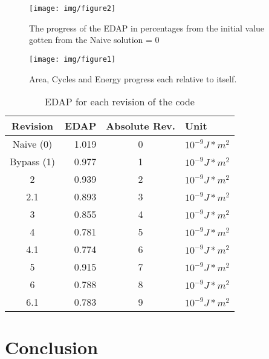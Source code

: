 \documentclass[10pt]{IEEEtran}
\begin{document}
\begin{figure}[h]
	\begin{center}
		\texttt{[image: img/figure2]}
		\caption{The progress of the EDAP in percentages from the initial value gotten from the Naive solution = 0}
		\label{fig:fig2}
	\end{center}
\end{figure} 

\begin{figure}[h]
	\begin{center}
		\texttt{[image: img/figure1]}
		\caption{Area, Cycles and Energy progress each relative to itself. }
		\label{fig:fig1}
	\end{center}
\end{figure} 

\begin{table}[htbp]
	\caption{EDAP for each revision of the code}
	\begin{center}
		\begin{tabular}{crcl}
			\midrule
			Revision & \multicolumn{1}{l}{ EDAP } & \multicolumn{1}{l}{ Absolute Rev. } &  Unit  \\ 
			\midrule
			Naive (0)   & 1.019 & 0 &   $10^{-9} J*m^2$  \\ 
			Bypass (1)   & 0.977 & 1 &   $10^{-9} J*m^2$  \\ 
			2  & 0.939 & 2 &   $10^{-9} J*m^2$  \\ 
			2.1  & 0.893 & 3 &   $10^{-9} J*m^2$  \\ 
			3  & 0.855 & 4 &   $10^{-9} J*m^2$  \\ 
			4  & 0.781 & 5 &   $10^{-9} J*m^2$  \\ 
			4.1  & 0.774 & 6 &   $10^{-9} J*m^2$  \\ 
			5  & 0.915 & 7 &   $10^{-9} J*m^2$  \\ 
			6  & 0.788 & 8 &   $10^{-9} J*m^2$  \\ 
			6.1  & 0.783 & 9 &   $10^{-9} J*m^2$  \\ 
			\midrule
		\end{tabular}
	\end{center}
	\label{}
\end{table}

\vspace{2em}

\section{Conclusion}
\end{document}
